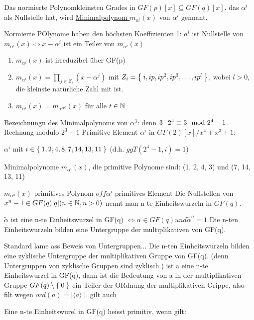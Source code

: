 \documentclass{../tudscript}
\begin{document}
Das normierte Polynomkleinsten Grades in $GF(p)[x] \subseteq GF(q)[x]$, das $\alpha^i$ als Nullstelle hat, wird \underline{Minimalpolynom $m_{\alpha^i}(x)$} von $\alpha^i$ gennant.

Normierte POlynome haben den höchsten Koeffizienten 1:
$a^i$ ist Nullstelle von $m_{\alpha^i}(x) \iff x- \alpha^i$ ist ein Teiler von $m_{\alpha^i} (x)$

\begin{enumerate}
\item $m_{\alpha^i} (x)$ ist irreduzibel über GF(p)
\item $m_{\alpha^i} (x) = \prod_{j \in Z_i} (x - \alpha^j)$ mit $Z_i = \Set{i, ip, ip^2, ip^3, \ldots, ip^l}$, wobei $l > 0$, die kleinste natürliche Zahl mit
  ist.
  \item $m_{\alpha^i} (x) = m_{\alpha^{ipt}} (x)$ für alle $t \in \mathbb{N}$
\end{enumerate}
Bezeichnungn des Minimalpolynoms von $\alpha^3$:
denn $3 \cdot 2^4 \equiv 3 \mod 2^4 -1$
Rechnung modulo $2^3 -1$
Primitive Element $\alpha^i$ in $GF(2)[x] / x^4 + x^3 +1$:

$\alpha^i$ mit $i \in \Set{1, 2, 4, 8, 7, 14, 13, 11}$ (d.h. $ggT(2^4 -1, i) = 1$)

Minimalpolynome $m_{\alpha^i}(x)$, die primitive Polynome sind: (1, 2, 4, 3) und (7, 14, 13, 11)

$m_{\alpha^o} (x)$ primitives Polynom $off \alpha^i$ primitives Element
Die Nullstellen von $x^n -1 \in GF(q)[q] (n \in \mathbb{N}, n >0)$ nennt man n-te Einheitswurzeln in $GF(q)$.

$\tilde{\alpha}$ ist eine n-te Einheitswurzel in GF(q) $\iff \alpha \in GF(q) und \tilde{\alpha}^n = 1$
Die n-ten Einheitswurzeln bilden eine Untergruppe der multiplikativen von GF(q).

Standard lame ass Beweis von Untergruppen...
Die n-ten Einheitswurzeln bilden eine zyklische Untergruppe der multiplikativen Gruppe von GF(q).
(denn Untergruppen von zyklische Gruppen sind zyklisch.)
ist a eine n-te Einheitswurzel in GF(q),
dann ist die Bedeutung von a in der multiplikativen Gruppe $GF(q) \setminus \Set{0}$ ein Teiler der ORdnung der multiplikativen Grippe, also filt
wegen $ord(a)  = \mid \langle a \rangle \mid$ gilt auch

Eine n-te Einheitswurel in GF(q) heisst primitiv, wenn gilt:
\end{document}

